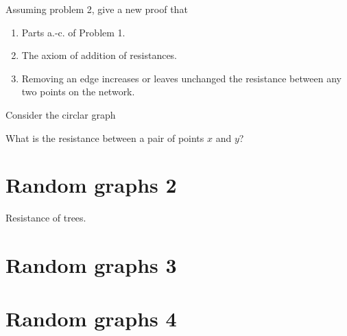 \documentclass[11pt,fleqn]{book} %
\begin{document}
\begin{problem}
  Assuming problem 2, give a new proof that 
  \begin{enumerate}[label =\alph*.]
   \item Parts a.-c. of Problem 1. 
   \item The axiom of addition of resistances.
   \item Removing an edge increases or leaves unchanged the resistance between any two points on the network.
 
  \end{enumerate}
\end{problem}



\begin{problem}
  Consider the circlar graph 
  \begin{center}
   \end{center} 
   What is the resistance between a pair of points $x$ and $y$?
\end{problem}























\newpage 
 \chapter{Random graphs 2}


\begin{problem}
  Resistance of trees. 
\end{problem}











\newpage 
    \chapter{Random graphs 3}
\kapiteldatum{}


\newpage 
    \chapter{Random graphs 4}
\kapiteldatum{}
\end{document}
